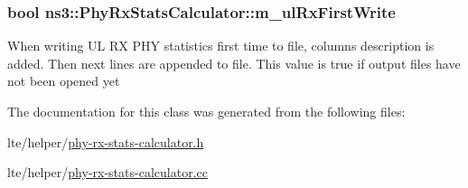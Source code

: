 \subsubsection[{\texorpdfstring{m\+\_\+ul\+Rx\+First\+Write}{m_ulRxFirstWrite}}]{\setlength{\rightskip}{0pt plus 5cm}bool ns3\+::\+Phy\+Rx\+Stats\+Calculator\+::m\+\_\+ul\+Rx\+First\+Write\hspace{0.3cm}{\ttfamily [private]}}\hypertarget{classns3_1_1PhyRxStatsCalculator_a55444d2052b042d6541f412b6a0340f3}{}\label{classns3_1_1PhyRxStatsCalculator_a55444d2052b042d6541f412b6a0340f3}
When writing UL RX P\+HY statistics first time to file, columns description is added. Then next lines are appended to file. This value is true if output files have not been opened yet 

The documentation for this class was generated from the following files\+:\begin{DoxyCompactItemize}
\item 
lte/helper/\hyperlink{phy-rx-stats-calculator_8h}{phy-\/rx-\/stats-\/calculator.\+h}\item 
lte/helper/\hyperlink{phy-rx-stats-calculator_8cc}{phy-\/rx-\/stats-\/calculator.\+cc}\end{DoxyCompactItemize}
